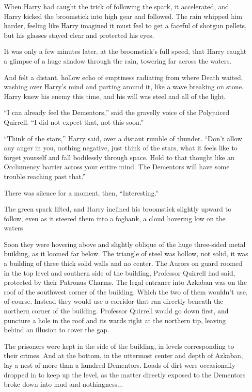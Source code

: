 When Harry had caught the trick of following the spark, it accelerated,
and Harry kicked the broomstick into high gear and followed. The rain
whipped him harder, feeling like Harry imagined it must feel to get a
faceful of shotgun pellets, but his glasses stayed clear and protected
his eyes.

It was only a few minutes later, at the broomstick's full speed, that
Harry caught a glimpse of a huge shadow through the rain, towering far
across the waters.

And felt a distant, hollow echo of emptiness radiating from where Death
waited, washing over Harry's mind and parting around it, like a wave
breaking on stone. Harry knew his enemy this time, and his will was
steel and all of the light.

``I can already feel the Dementors,'' said the gravelly voice of the
Polyjuiced Quirrell. ``I did not expect that, not this soon.''

``Think of the stars,'' Harry said, over a distant rumble of thunder.
``Don't allow any anger in you, nothing negative, just think of the
stars, what it feels like to forget yourself and fall bodilessly through
space. Hold to that thought like an Occlumency barrier across your
entire mind. The Dementors will have some trouble reaching past that.''

There was silence for a moment, then, ``Interesting.''

The green spark lifted, and Harry inclined his broomstick slightly
upward to follow, even as it steered them into a fogbank, a cloud
hovering low on the waters.

Soon they were hovering above and slightly oblique of the huge
three-sided metal building, as it loomed far below. The triangle of
steel was hollow, not solid, it was a building of three thick solid
walls and no center. The Aurors on guard roomed in the top level and
southern side of the building, Professor Quirrell had said, protected by
their Patronus Charms. The legal entrance into Azkaban was on the roof
of the southwest corner of the building. Which the two of them wouldn't
use, of course. Instead they would use a corridor that ran directly
beneath the northern corner of the building. Professor Quirrell would go
down first, and puncture a hole in the roof and its wards right at the
northern tip, leaving behind an illusion to cover the gap.

The prisoners were kept in the side of the building, in levels
corresponding to their crimes. And at the bottom, in the uttermost
center and depth of Azkaban, lay a nest of more than a hundred
Dementors. Loads of dirt were occasionally dropped in to keep up the
level, as the matter directly exposed to the Dementors broke down into
mud and nothingness...

